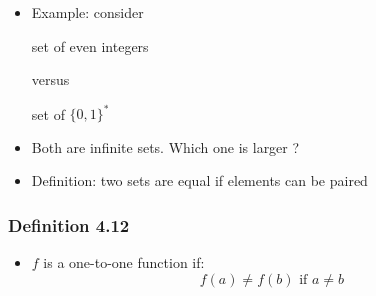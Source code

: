 \begin{frame}[allowframebreaks]
\begin{itemize}
\item Example: consider
  \begin{center}
  set of even integers
\end{center}
versus
\begin{center}
set of $\{0,1\}^*$
\end{center}
\item Both are infinite sets. Which one is larger ?
\item Definition: two sets are equal if elements
can be paired
\end{itemize}\end{frame} \begin{frame}[allowframebreaks] \frametitle{Definition 4.12}
  \begin{itemize}
\item $f$ is a one-to-one function if:
  \begin{equation*}
f(a)\neq f(b) \text{ if } a \neq b
\end{equation*}


\end{itemize}
\end{frame}
